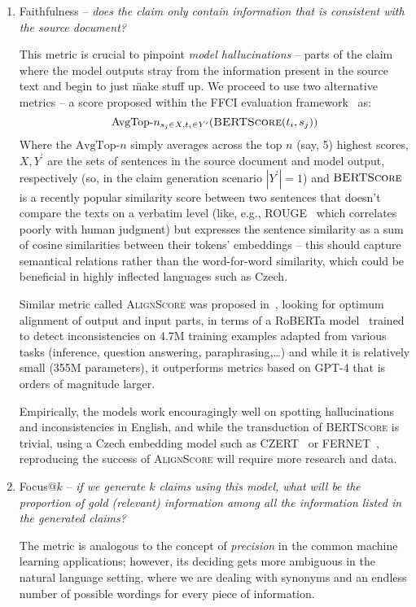 \begin{enumerate}
    \item {\techbf Faithfulness} -- \textit{does the claim only contain information that is consistent with the source document?}
    
    This metric is crucial to pinpoint \textit{model hallucinations} -- parts of the claim where the model outputs stray from the information present in the source text and begin to just \"{make stuff up}. We proceed to use two alternative metrics -- a score proposed within the FFCI evaluation framework~\cite{ffci} as: 
    $$\text{AvgTop-}n_{s_j\in X, t_i\in Y^\prime}(\textsc{BERTScore}(t_i,s_j))$$
    Where the $\text{AvgTop-}n$ simply averages across the top $n$ (say, 5) highest scores, $X,Y^\prime$ are the sets of sentences in the source document and model output, respectively (so, in the claim generation scenario $|Y^\prime|=1$) and $\textsc{BERTScore}$~\cite{bert-score} is a recently popular similarity score between two sentences that doesn't compare the texts on a verbatim level (like, e.g., ROUGE~\cite{lin-2004-rouge} which correlates poorly with human judgment) but expresses the sentence similarity as a sum of cosine similarities between their tokens' embeddings -- this should capture semantical relations rather than the word-for-word similarity, which could be beneficial in highly inflected languages such as Czech.

    Similar metric called \textsc{AlignScore} was proposed in~\cite{zha2023alignscore}, looking for optimum alignment of output and input parts, in terms of a RoBERTa model~\cite{roberta} trained to detect inconsistencies on 4.7M training examples adapted from various tasks (inference, question answering, paraphrasing,\dots) and while it is relatively small (355M parameters), it outperforms metrics based on GPT-4 that is orders of magnitude larger. 

    Empirically, the models work encouragingly well on spotting hallucinations and inconsistencies in English, and while the transduction of \textsc{BERTScore} is trivial, using a Czech embedding model such as CZERT~\cite{czert} or FERNET~\cite{fernet}, reproducing the success of \textsc{AlignScore} will require more research and data.

    \item {\techbf Focus}$@k$ -- \textit{if we generate $k$ claims using this model, what will be the proportion of gold (relevant) information among all the information listed in the generated claims?}
    
    The metric is analogous to the concept of \textit{precision} in the common machine learning applications; however, its deciding gets more ambiguous in the natural language setting, where we are dealing with synonyms and an endless number of possible wordings for every piece of information.


\end{enumerate}
